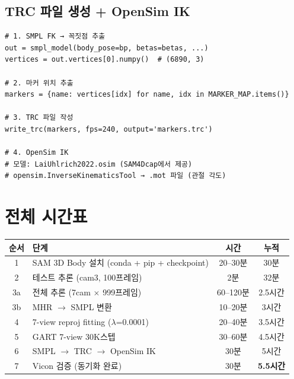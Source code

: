 \documentclass[11pt, a4paper]{report}
\begin{document}
\section{TRC 파일 생성 + OpenSim IK}

\begin{codebox}[title={SMPL $\to$ TRC $\to$ OpenSim}]
\begin{verbatim}
# 1. SMPL FK → 꼭짓점 추출
out = smpl_model(body_pose=bp, betas=betas, ...)
vertices = out.vertices[0].numpy()  # (6890, 3)

# 2. 마커 위치 추출
markers = {name: vertices[idx] for name, idx in MARKER_MAP.items()}

# 3. TRC 파일 작성
write_trc(markers, fps=240, output='markers.trc')

# 4. OpenSim IK
# 모델: LaiUhlrich2022.osim (SAM4Dcap에서 제공)
# opensim.InverseKinematicsTool → .mot 파일 (관절 각도)
\end{verbatim}
\end{codebox}


\chapter{전체 시간표}

\begin{center}
\renewcommand{\arraystretch}{1.4}
\begin{tabular}{clcc}
\toprule
\textbf{순서} & \textbf{단계} & \textbf{시간} & \textbf{누적} \\
\midrule
1 & SAM 3D Body 설치 (conda + pip + checkpoint) & 20--30분 & 30분 \\
2 & 테스트 추론 (cam3, 100프레임) & 2분 & 32분 \\
3a & 전체 추론 (7cam $\times$ 999프레임) & 60--120분 & 2.5시간 \\
3b & MHR $\to$ SMPL 변환 & 10--20분 & 3시간 \\
4 & 7-view reproj fitting ($\lambda$=0.0001) & 20--40분 & 3.5시간 \\
5 & GART 7-view 30K스텝 & 30--60분 & 4.5시간 \\
6 & SMPL $\to$ TRC $\to$ OpenSim IK & 30분 & 5시간 \\
7 & Vicon 검증 (동기화 완료) & 30분 & \textbf{5.5시간} \\
\bottomrule
\end{tabular}
\end{center}
\end{document}
